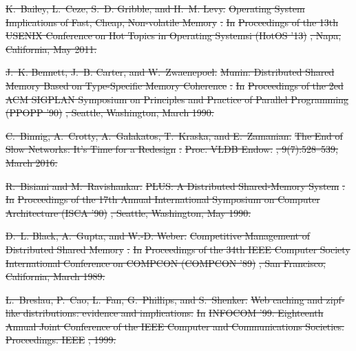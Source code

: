 \documentclass[sigconf]{acmart}
\renewcommand{\em}{\it}
\providecommand{\DIFdel}[1]{{\protect\color{red}\sout{#1}}}                      %
\begin{document}
{%
\DIFdel{K.~Bailey, L.~Ceze, S.~D. Gribble, and H.~M. Levy.
}%
\DIFdel{Operating System Implications of Fast, Cheap, Non-volatile Memory}%
\DIFdel{.
}%
\DIFdel{In }%
\DIFdel{Proceedings of the 13th USENIX Conference on Hot Topics in
  Operating Systemsi (HotOS '13)}%
\DIFdel{, Napa, California, May 2011.
}%

\DIFdel{J.~K. Bennett, J.~B. Carter, and W.~Zwaenepoel.
}%
\DIFdel{Munin: Distributed Shared Memory Based on Type-Specific Memory
  Coherence}%
\DIFdel{.
}%
\DIFdel{In }%
\DIFdel{Proceedings of the 2ed ACM SIGPLAN Symposium on Principles
  and Practice of Parallel Programming (PPOPP '90)}%
\DIFdel{, Seattle, Washington, March
  1990.
}%

\DIFdel{C.~Binnig, A.~Crotty, A.~Galakatos, T.~Kraska, and E.~Zamanian.
}%
\DIFdel{The End of Slow Networks: It's Time for a Redesign}%
\DIFdel{.
}%
\DIFdel{Proc. VLDB Endow.}%
\DIFdel{, 9(7):528--539, March 2016.
}%

\DIFdel{R.~Bisiani and M.~Ravishankar.
}%
\DIFdel{PLUS: A Distributed Shared-Memory System}%
\DIFdel{.
}%
\DIFdel{In }%
\DIFdel{Proceedings of the 17th Annual International Symposium on
  Computer Architecture (ISCA '90)}%
\DIFdel{, Seattle, Washington, May 1990.
}%

\DIFdel{D.~L. Black, A.~Gupta, and W.-D. Weber.
}%
\DIFdel{Competitive Management of Distributed Shared Memory}%
\DIFdel{.
}%
\DIFdel{In }%
\DIFdel{Proceedings of the 34th IEEE Computer Society International
  Conference on COMPCON (COMPCON '89)}%
\DIFdel{, San Francisco, California, March 1989.
}%

\DIFdel{L.~Breslau, P.~Cao, L.~Fan, G.~Phillips, and S.~Shenker.
}%
\DIFdel{Web caching and zipf-like distributions: evidence and implications.
}%
\DIFdel{In }%
\DIFdel{INFOCOM '99. Eighteenth Annual Joint Conference of the IEEE
  Computer and Communications Societies.
Proceedings. IEEE}%
\DIFdel{, 1999.
}%

}
\end{document}

